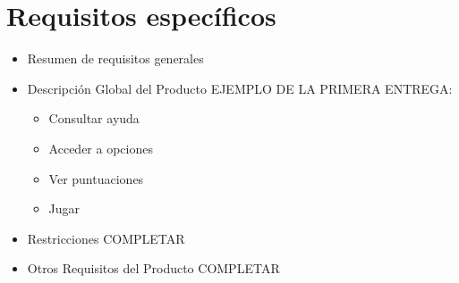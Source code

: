 \chapter{Requisitos específicos}
\begin{itemize}
\item Resumen de requisitos generales
\item Descripción Global del Producto
EJEMPLO DE LA PRIMERA ENTREGA:

\begin{itemize}
\item Consultar ayuda
\item Acceder a opciones
\item Ver puntuaciones
\item Jugar
\end{itemize}

\item Restricciones
  COMPLETAR
\item Otros Requisitos del Producto
  COMPLETAR
\end{itemize}

